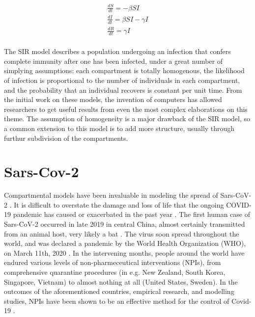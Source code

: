 \begin{eqnarray}
    \frac{dS}{dt} = -\beta S I  \\
    \frac{dI}{dt} = \beta S I - \gamma I\\
    \frac{dR}{dt} = \gamma I\\
    \label{SIR}
\end{eqnarray}

The SIR model describes a population undergoing an infection that confers complete immunity after one has been infected, under a great number of simplying assumptions: each compartment is totally homogenous, the likelihood of infection is proportional to the number of individuals in each compartment, and the probability that an individual recovers is constant per unit time. From the initial work on these models, the invention of computers has allowed researchers to get useful results from even the most complex elaborations on this theme. The assumption of homogeneity is a major drawback of the SIR model, so a common extension to this model is to add more structure, usually through furthur subdivision of the compartments. 



\section{Sars-Cov-2}

Compartmental models have been invaluable in modeling the spread of Sars-CoV-2 \cite{thompson2020epidemiological}. It is difficult to overstate the damage and loss of life that the ongoing COVID-19 pandemic has caused or exacerbated in the past year \cite{miller2020disease,who2021impact}. The first human case of Sars-CoV-2 occurred in late 2019 in central China, almost certainly transmitted from an animal host, very likely a bat \cite{andersen2020proximal,rasmussen2021origins,zhu2020novel}. The virus soon spread throughout the world, and was declared a pandemic by the World Health Organization (WHO), on March 11th, 2020 \cite{who2020announces}. In the intervening months, people around the world have endured various levels of non-pharmeceutical interventions (NPIs), from comprehensive quarantine procedures (in e.g. New Zealand, South Korea, Singapore, Vietnam) to almost nothing at all (United States, Sweden). In the outcomes of the aforementioned countries, empirical research, and modelling studies, NPIs have been shown to be an effective method for the control of Covid-19 \cite{anderson2020estimating,flaxman2020estimating,ferguson2020report,demirguc2020sooner}. 



